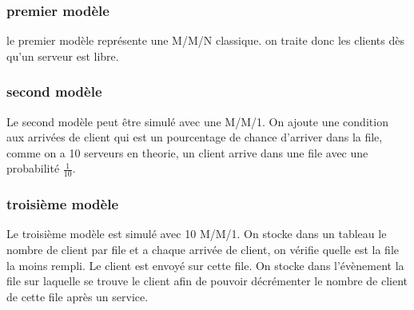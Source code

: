 \documentclass[a4paper,11pt]{article}
\begin{document}
	\subsubsection{premier modèle}
		le premier modèle représente une M/M/N classique. on traite donc les clients dès qu'un serveur est libre.
	\subsubsection{second modèle}
		Le second modèle peut être simulé avec une M/M/1. On ajoute une condition aux arrivées de client qui est un pourcentage de chance d'arriver dans la file, comme on a 10 serveurs en theorie, un client arrive dans une file avec une probabilité $\frac{1}{10}$.
	\subsubsection{troisième modèle}
		Le troisième modèle est simulé avec 10 M/M/1. On stocke dans un tableau le nombre de client par file et a chaque arrivée de client, on vérifie quelle est la file la moins rempli. Le client est envoyé sur cette file. On stocke dans l'évènement la file sur laquelle se trouve le client afin de pouvoir décrémenter le nombre de client de cette file après un service. 
	
\end{document}
